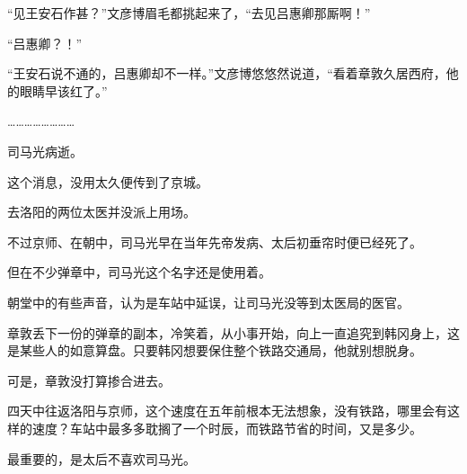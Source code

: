 “见王安石作甚？”文彦博眉毛都挑起来了，“去见吕惠卿那厮啊！”

“吕惠卿？！”

“王安石说不通的，吕惠卿却不一样。”文彦博悠悠然说道，“看着章敦久居西府，他的眼睛早该红了。”

……………………

司马光病逝。

这个消息，没用太久便传到了京城。

去洛阳的两位太医并没派上用场。

不过京师、在朝中，司马光早在当年先帝发病、太后初垂帘时便已经死了。

但在不少弹章中，司马光这个名字还是使用着。

朝堂中的有些声音，认为是车站中延误，让司马光没等到太医局的医官。

章敦丢下一份的弹章的副本，冷笑着，从小事开始，向上一直追究到韩冈身上，这是某些人的如意算盘。只要韩冈想要保住整个铁路交通局，他就别想脱身。

可是，章敦没打算掺合进去。

四天中往返洛阳与京师，这个速度在五年前根本无法想象，没有铁路，哪里会有这样的速度？车站中最多多耽搁了一个时辰，而铁路节省的时间，又是多少。

最重要的，是太后不喜欢司马光。

